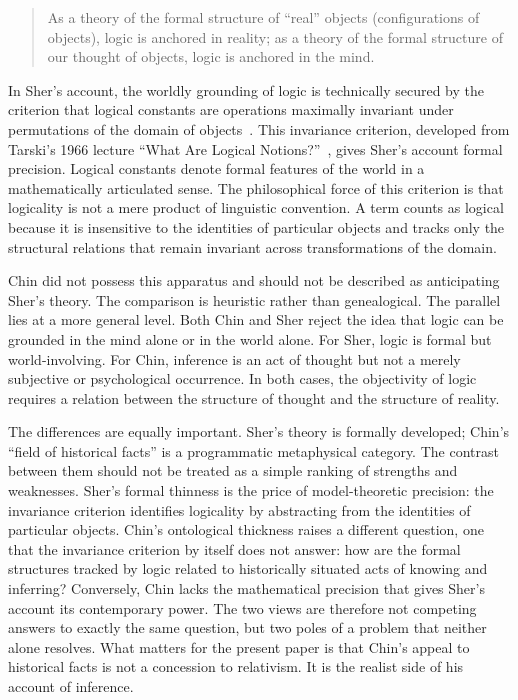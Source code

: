 \documentclass{birkjour}
\begin{document}
\begin{quote}
As a theory of the formal structure of ``real'' objects (configurations of objects), logic is anchored in reality; as a theory of the formal structure of our thought of objects, logic is anchored in the mind.~\cite[p.~272]{Sher2016}
\end{quote}

In Sher's account, the worldly grounding of logic is technically secured by the criterion that logical constants are operations maximally invariant under permutations of the domain of objects~\cite[pp.~160--167]{Sher2013}. This invariance criterion, developed from Tarski's 1966 lecture ``What Are Logical Notions?''~\cite{Tarski1986}, gives Sher's account formal precision. Logical constants denote formal features of the world in a mathematically articulated sense. The philosophical force of this criterion is that logicality is not a mere product of linguistic convention. A term counts as logical because it is insensitive to the identities of particular objects and tracks only the structural relations that remain invariant across transformations of the domain.

Chin did not possess this apparatus and should not be described as anticipating Sher's theory. The comparison is heuristic rather than genealogical. The parallel lies at a more general level. Both Chin and Sher reject the idea that logic can be grounded in the mind alone or in the world alone. For Sher, logic is formal but world-involving. For Chin, inference is an act of thought but not a merely subjective or psychological occurrence. In both cases, the objectivity of logic requires a relation between the structure of thought and the structure of reality.

The differences are equally important. Sher's theory is formally developed; Chin's ``field of historical facts'' is a programmatic metaphysical category. The contrast between them should not be treated as a simple ranking of strengths and weaknesses. Sher's formal thinness is the price of model-theoretic precision: the invariance criterion identifies logicality by abstracting from the identities of particular objects. Chin's ontological thickness raises a different question, one that the invariance criterion by itself does not answer: how are the formal structures tracked by logic related to historically situated acts of knowing and inferring? Conversely, Chin lacks the mathematical precision that gives Sher's account its contemporary power. The two views are therefore not competing answers to exactly the same question, but two poles of a problem that neither alone resolves. What matters for the present paper is that Chin's appeal to historical facts is not a concession to relativism. It is the realist side of his account of inference.
\end{document}
